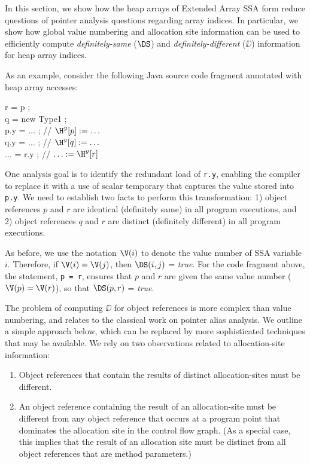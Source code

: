 
In this section, we show how the heap arrays of Extended Array SSA form
reduce questions of pointer analysis questions regarding array indices.
In particular, we show how global value numbering and allocation
site information can be used to efficiently 
compute
{\it definitely-same} ($\DS$) and {\it definitely-different}
($\DD$) information for 
heap array indices.

As an example, consider the following Java source
code fragment annotated with heap array accesses:
\begin{center}
\begin{minipage}{3.0in}
\begin{programa}
 r = p ;\\
 q = new Type1 ;\\
 p.y = $\ldots$ ; \Te // $\H^y[p] := \ldots$\\
 q.y = $\ldots$ ; \Te // $\H^y[q] := \ldots$\\
 $\ldots$ = r.y ; \Te // $\ldots := \H^y[r]$ \\
\end{programa}
\end{minipage}
\end{center}
One analysis goal is to identify the redundant load of {\tt r.y}, enabling
the compiler to replace it with
a use of scalar temporary that captures the value stored into {\tt p.y}.
We need to establish two facts to perform this transformation:
1) object references $p$ and $r$ are identical (definitely same) in 
all program executions, and 2)
object references $q$ and $r$ are distinct (definitely different) in
all program executions. 

As before, we use the notation $\V(i)$ to denote the value number of SSA 
variable $i$.  Therefore, if $\V(i) = \V(j)$, then 
$\DS(i,j)$ = {\it true}.  
For the code fragment above, the  statement, {\tt p~=~r},
ensures that $p$ and $r$ are given the same value number 
(\ie\ $\V(p) = \V(r)$), so that $\DS(p,r)$ = {\it true}.

The problem of
computing $\DD$ for object references is more complex than value numbering, and relates
to the classical work on pointer alias analysis.  We outline a simple approach below, which can be replaced by more sophisticated techniques that may be available.
We rely on two observations related to allocation-site information:
\begin{enumerate}
\item Object references that contain the results of distinct allocation-sites
must be different.
\item An object reference containing the result of an allocation-site
must be different from any object reference 
that occurs at a program point that dominates the allocation site in the control flow graph.
(As a special case, this implies that the result of an allocation site
must be distinct from all object references that are method parameters.)
\end{enumerate}

